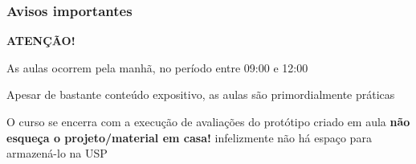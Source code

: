 \expandafter\documentclass\expandafter[table, usenames, svgnames, dvipsnames, \classopts]{beamer}
\begin{document}
\begin{frame} 
	\frametitle{\textbf{Avisos importantes}}
	
	\begin{block}{\centering\textbf{ATENÇÃO!}}
	
		\begin{outline}
			\1 As aulas ocorrem pela manhã, no período entre 09:00 e 12:00
		    
			\vspace{1em}
		    
			\1 Apesar de bastante conteúdo expositivo, as aulas são primordialmente práticas
			
			\vspace{1em}
				    
			\1 O curso se encerra com a execução de avaliações do protótipo criado em aula
				\2 {\scriptsize \textbf{não esqueça o projeto/material em casa!}}
				\2 {\scriptsize infelizmente não há espaço para armazená-lo na USP}
		\end{outline}

	\end{block}	
	
\end{frame}
\end{document}
